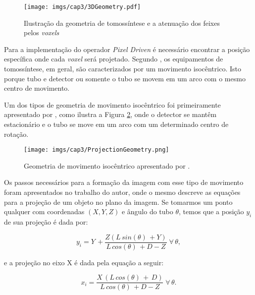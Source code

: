 \begin{figure}[H]
	\caption{Ilustração da geometria de tomossíntese e a atenuação dos feixes pelos \textit{voxels}}
	\begin{center}
		\texttt{[image: imgs/cap3/3DGeometry.pdf]}
	\end{center}
	\label{fig:imgCap33DGeometry}
\end{figure}

Para a implementação do operador \textit{Pixel Driven} é necessário encontrar a posição específica onde cada \textit{voxel} será projetado. Segundo , os equipamentos de tomossíntese, em geral, são caracterizados por um movimento isocêntrico. Isto porque tubo e detector ou somente o tubo se movem em um arco com o mesmo centro de movimento.  

Um dos tipos de geometria de movimento isocêntrico foi primeiramente apresentado por , como ilustra a Figura \ref{fig:imgCap3ProjectionGeometry}, onde o detector se mantêm estacionário e o tubo se move em um arco com um determinado centro de rotação. 

\begin{figure}[H]
	\caption{Geometria de movimento isocêntrico apresentado por .}
	\begin{center}
		\texttt{[image: imgs/cap3/ProjectionGeometry.png]}
	\end{center}
	\label{fig:imgCap3ProjectionGeometry}
\end{figure}

Os passos necessários para a formação da imagem com esse tipo de movimento foram apresentados no trabalho do autor, onde o mesmo descreve as equações para a projeção de um objeto no plano da imagem. Se tomarmos um ponto qualquer com coordenadas $(X,Y,Z)$ e ângulo do tubo $\theta$, temos que a posição $y_{i}$ de sua projeção é dada por:

\begin{equation}
y_{i} = Y \, + \dfrac{ Z(L \, sin(\theta) \, + Y)}{L \, cos(\theta) \, + D - Z} \; \forall \, \theta ,
\label{eq:eqCap3ProjectionY}
\end{equation} 

\noindent e a projeção no eixo X é dada pela equação a seguir:

\begin{equation}
x_{i} = \dfrac{X \, (L \, cos(\theta)\,+\, D)}{L \, cos(\theta) \, + D - Z} \; \forall \, \theta.
\label{eq:eqCap3ProjectionX}
\end{equation} 


